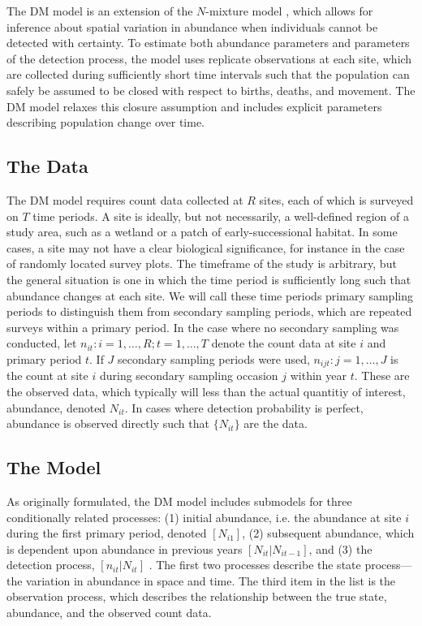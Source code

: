\documentclass[12pt]{article}
\begin{document}
The DM model is an extension of the $N$-mixture model
\citep{royle:2004biom}, which allows for inference about spatial
variation in abundance when individuals cannot be detected with
certainty. To estimate both abundance parameters and parameters of the
detection process, the model uses replicate observations at each site,
which are collected during sufficiently short time intervals such that
the population can safely be assumed to be closed with respect to
births, deaths, and movement. The DM model relaxes this closure
assumption and includes explicit parameters
describing population change over time.


\subsection{The Data}

The DM model requires count data collected at $R$ sites, each of which
is surveyed on $T$ time periods. A site is ideally, but not necessarily, a
well-defined region of a study area, such as a wetland or a patch of
early-successional habitat. In some cases, a site may not have a clear
biological significance, for instance in the case of randomly located
survey plots. The timeframe of the study is arbitrary, but the general
situation is one in which the time period is sufficiently long such
that abundance changes at each site. We will call
these time periods primary sampling periods to distinguish them from
secondary sampling periods, which are repeated surveys within a
primary period. In the case where no secondary sampling was conducted,
let $n_{it}: i=1,\hdots,R; t=1,\hdots,T$ denote the count data at site
$i$ and primary period $t$. If $J$ secondary sampling periods were used, $n_{ijt}:
j=1,\hdots,J$ is the count at site $i$ during secondary sampling
occasion $j$ within year $t$. These are the observed data, which
typically will less than the actual quantitiy of interest, abundance,
denoted $N_{it}$. In cases where detection probability is perfect,
abundance is observed directly such that $\{N_{it}\}$ are the data.

\subsection{The Model}

As originally formulated, the DM model includes submodels for three
conditionally related processes: (1) initial abundance, i.e. the
abundance at site $i$ during the first primary period,
denoted $[N_{i1}]$, (2) subsequent abundance, which is dependent upon
abundance in previous years $[N_{it}|N_{it-1}]$, and (3) the
detection process, $[n_{it}|N_{it}]$ \citep{dail_madsen:2011}.
The first two processes describe the state process---the
variation in abundance in space and time. The third item in the list
is the observation process, which describes the relationship between
the true state, abundance, and the observed count data.
\end{document}
